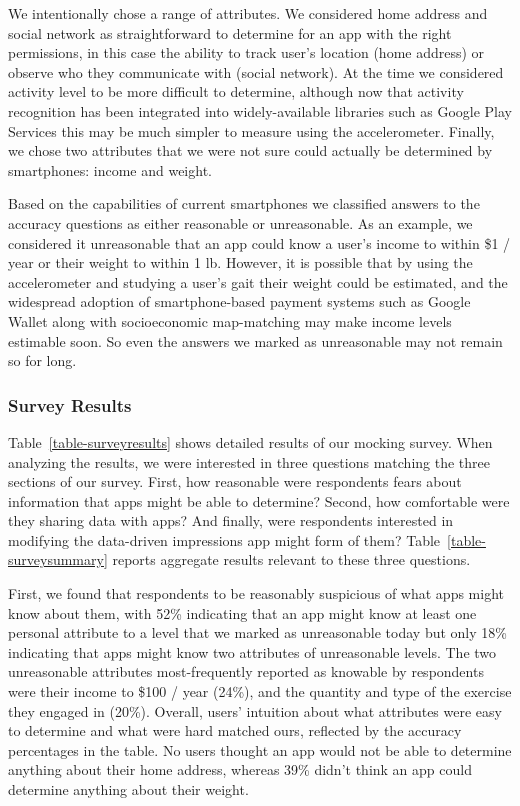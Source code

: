 We intentionally chose a range of attributes. We considered home address and
social network as straightforward to determine for an app with the right
permissions, in this case the ability to track user's location (home address)
or observe who they communicate with (social network). At the time we
considered activity level to be more difficult to determine, although now
that activity recognition has been integrated into widely-available libraries
such as Google Play Services this may be much simpler to measure using the
accelerometer. Finally, we chose two attributes that we were not sure could
actually be determined by smartphones: income and weight.

Based on the capabilities of current smartphones we classified answers to the
accuracy questions as either reasonable or unreasonable. As an example, we
considered it unreasonable that an app could know a user's income to within
\$1 / year or their weight to within 1 lb. However, it is possible that by
using the accelerometer and studying a user's gait their weight could be
estimated, and the widespread adoption of smartphone-based payment systems
such as Google Wallet along with socioeconomic map-matching may make income
levels estimable soon. So even the answers we marked as unreasonable may not
remain so for long.

\subsubsection{Survey Results}
\label{subsec-surveyresults}

Table~\ref{table-surveyresults} shows detailed results of our mocking survey.
When analyzing the results, we were interested in three questions matching
the three sections of our survey. First, how reasonable were respondents
fears about information that apps might be able to determine? Second, how
comfortable were they sharing data with apps? And finally, were respondents
interested in modifying the data-driven impressions app might form of them?
Table~\ref{table-surveysummary} reports aggregate results relevant to these
three questions.

First, we found that respondents to be reasonably suspicious of what apps
might know about them, with 52\% indicating that an app might know at least
one personal attribute to a level that we marked as unreasonable today but
only 18\% indicating that apps might know two attributes of unreasonable
levels. The two unreasonable attributes most-frequently reported as knowable
by respondents were their income to \$100 / year (24\%), and the quantity and
type of the exercise they engaged in (20\%). Overall, users' intuition about
what attributes were easy to determine and what were hard matched ours,
reflected by the accuracy percentages in the table. No users thought an
app would not be able to determine anything about their home address,
whereas 39\% didn't think an app could determine anything about their weight.

